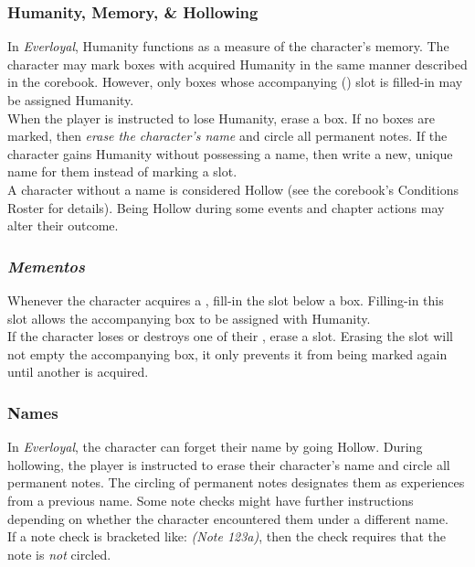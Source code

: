 \documentclass[12pt]{article}
\begin{document}
\begin{multicols*}{2}
\subsubsection{Humanity, Memory, \& Hollowing}
\hypertarget{HMN}{}\hypertarget{MEM}{}
In \emph{Everloyal}, Humanity functions as a measure of the character’s memory. The character may mark  boxes with acquired Humanity in the same manner described in the corebook. However, only  boxes whose accompanying  () slot is filled-in may be assigned Humanity.\\
When the player is instructed to lose Humanity, erase a  box. If no  boxes are marked, then \emph{erase the character’s name} and circle all permanent notes. If the character gains Humanity without possessing a name, then write a new, unique name for them instead of marking a  slot.\\
A character without a name is considered Hollow (see the corebook’s Conditions Roster for details). Being Hollow during some events and chapter actions may alter their outcome.

\subsubsection{\emph{Mementos}}
\hypertarget{mementos}{}\hypertarget{memento}{}
Whenever the character acquires a , fill-in the  slot below a  box. Filling-in this slot allows the accompanying  box to be assigned with Humanity.\\
If the character loses or destroys one of their , erase a  slot. Erasing the  slot will not empty the accompanying  box, it only prevents it from being marked again until another  is acquired.

\subsubsection{Names}
In \emph{Everloyal}, the character can forget their name by going Hollow. During hollowing, the player is instructed to erase their character’s name and circle all permanent notes. The circling of permanent notes designates them as experiences from a previous name. Some note checks might have further instructions depending on whether the character encountered them under a different name.\\
If a note check is bracketed like: \emph{(Note 123a)}, then the check requires that the note is \emph{not} circled.

\end{multicols*}
\pagebreak
\end{document}
